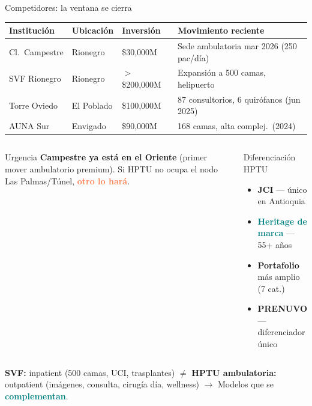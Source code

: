 \documentclass[aspectratio=169, 11pt]{beamer}
\newcommand{\highlight}[1]{\textcolor{teal}{\textbf{#1}}}
\newcommand{\danger}[1]{\textcolor{coral}{\textbf{#1}}}
\begin{document}
\begin{frame}{Competidores: la ventana se cierra}
\vspace{-4pt}
{\tiny\setlength{\tabcolsep}{3pt}
\begin{tabular}{@{}p{2.5cm}p{2cm}p{1.8cm}p{4.5cm}@{}}
\toprule
\textbf{Institución} & \textbf{Ubicación} & \textbf{Inversión} & \textbf{Movimiento reciente} \\
\midrule
\rowcolor{coral!8}
Cl.\ Campestre & Rionegro & \$30,000M & Sede ambulatoria mar 2026 (250 pac/día) \\
SVF Rionegro & Rionegro & $>$\$200,000M & Expansión a 500 camas, helipuerto \\
\rowcolor{coral!8}
Torre Oviedo & El Poblado & \$100,000M & 87 consultorios, 6 quirófanos (jun 2025) \\
AUNA Sur & Envigado & \$90,000M & 168 camas, alta complej.\ (2024) \\
\bottomrule
\end{tabular}
}

\vspace{3pt}
\begin{columns}[T]
\begin{alertblock}{\small Urgencia}
\scriptsize
\textbf{Campestre ya está en el Oriente} (primer mover ambulatorio premium). Si HPTU no ocupa el nodo Las Palmas/Túnel, \danger{otro lo hará}.
\end{alertblock}

\begin{exampleblock}{\small Diferenciación HPTU}
\scriptsize
\begin{itemize}\setlength{\itemsep}{0pt}
  \item \textbf{JCI} --- único en Antioquia
  \item \highlight{Heritage de marca} --- 55+ años
  \item \textbf{Portafolio} más amplio (7 cat.)
  \item \textbf{PRENUVO} --- diferenciador único
\end{itemize}
\end{exampleblock}
\end{columns}

\vspace{2pt}
{\tiny
\textbf{SVF:} inpatient (500 camas, UCI, trasplantes) $\neq$ \textbf{HPTU ambulatoria:} outpatient (imágenes, consulta, cirugía día, wellness) $\to$ Modelos que se \highlight{complementan}.}
\end{frame}
\end{document}
